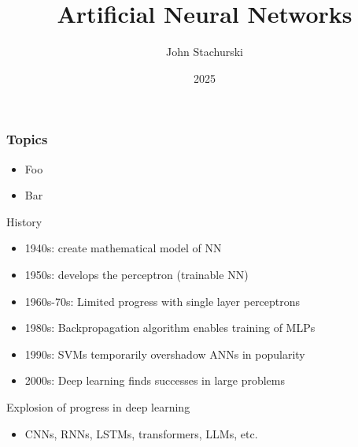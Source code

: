 

\title{Artificial Neural Networks}

\author{John Stachurski}


\date{2025}




\begin{frame}
  \titlepage
\end{frame}



\begin{frame}
    \frametitle{Topics}

    \begin{itemize}
        \item Foo
        \vspace{0.5em}
        \item Bar
        \vspace{0.5em}
    \end{itemize}

\end{frame}


\begin{frame}{History}

    \begin{itemize}
        \item 1940s:  create mathematical model of NN
        \vspace{0.5em}
        \item 1950s:  develops the perceptron (trainable NN)
        \vspace{0.5em}
        \item 1960s-70s: Limited progress with single layer perceptrons
        \vspace{0.5em}
        \item 1980s: Backpropagation algorithm enables training of MLPs
        \vspace{0.5em}
        \item 1990s: SVMs temporarily overshadow ANNs in popularity
        \vspace{0.5em}
        \item 2000s: Deep learning finds successes in large problems
    \end{itemize}
    
        \vspace{0.5em}
        \vspace{0.5em}
     Explosion of progress in deep learning 

    \begin{itemize}
        \item CNNs, RNNs, LSTMs, transformers, LLMs, etc.
    \end{itemize}

\end{frame}

